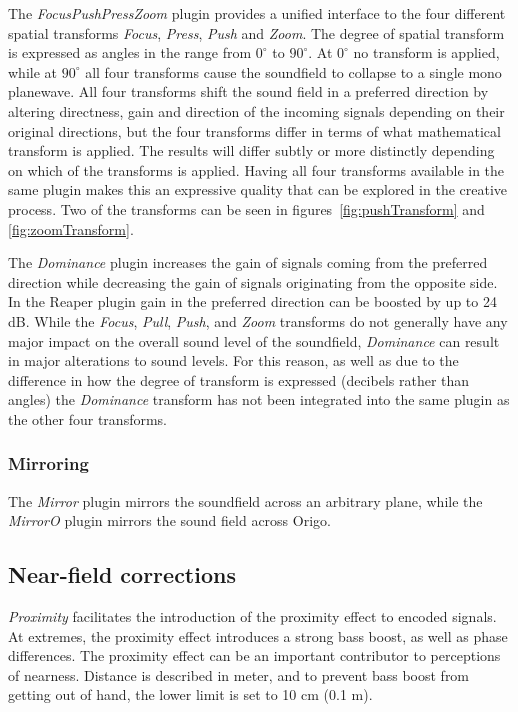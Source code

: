 \documentclass{article}
\begin{document}
The \emph{FocusPushPressZoom} plugin provides a unified interface to the four different spatial transforms \emph{Focus}, \emph{Press}, \emph{Push} and \emph{Zoom}.
The degree of spatial transform is expressed as angles in the range from $0^\circ$ to $90^\circ$. 
At $0^\circ$ no transform is applied, while at $90^\circ$ all four transforms cause the soundfield to collapse to a single mono planewave.
All four transforms shift the sound field in a preferred direction by altering directness, gain and direction of the incoming signals depending on their original directions, but the four transforms differ in terms of what mathematical transform is applied.
The results will differ subtly or more distinctly depending on which of the transforms is applied.
Having all four transforms available in the same plugin makes this an expressive quality that can be explored in the creative process.
Two of the transforms can be seen in figures~\ref{fig:pushTransform} and \ref{fig:zoomTransform}.

The \emph{Dominance} plugin increases the gain of signals coming from the preferred direction while decreasing the gain of signals originating from the opposite side.
In the Reaper plugin gain in the preferred direction can be boosted by up to 24 dB.
While the \emph{Focus}, \emph{Pull}, \emph{Push}, and \emph{Zoom} transforms do not generally have any major impact on the overall sound level of the soundfield, \emph{Dominance} can result in major alterations to sound levels.
For this reason, as well as due to the difference in how the degree of transform is expressed (decibels rather than angles) the \emph{Dominance} transform has not been integrated into the same plugin as the other four transforms.


\subsubsection{Mirroring}\label{sec:mirror}

The \emph{Mirror} plugin mirrors the soundfield across an arbitrary plane, while the \emph{MirrorO} plugin mirrors the sound field across Origo.



\subsection{Near-field corrections}\label{sec:near-field}

\emph{Proximity} facilitates the introduction of the proximity effect to encoded signals.
At extremes, the proximity effect introduces a strong bass boost, as well as phase differences.
The proximity effect can be an important contributor to perceptions of nearness.
Distance is described in meter, and to prevent bass boost from getting out of hand, the lower limit is set to 10 cm (0.1 m).
\end{document}
